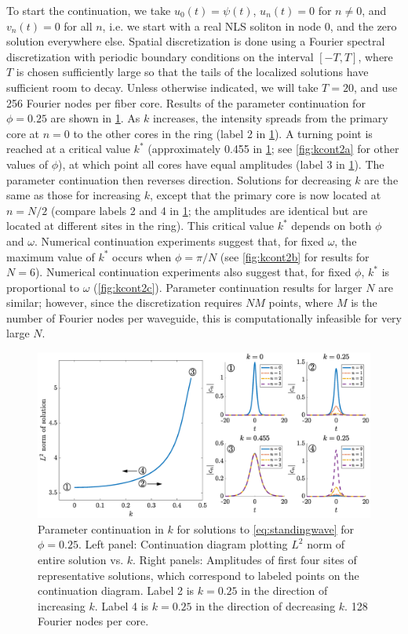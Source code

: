 \documentclass[11pt,reqno]{amsart}
\begin{document}
To start the continuation, we take $u_0(t) = \psi(t)$, $u_n(t) = 0$ for $n \neq 0$, and $v_n(t) = 0$ for all $n$, i.e. we start with a real NLS soliton in node 0, and the zero solution everywhere else. Spatial discretization is done using a Fourier spectral discretization with periodic boundary conditions on the interval $[-T,T]$, where $T$ is chosen sufficiently large so that the tails of the localized solutions have sufficient room to decay. Unless otherwise indicated, we will take $T=20$, and use 256 Fourier nodes per fiber core. Results of the parameter continuation for $\phi = 0.25$ are shown in \cref{fig:kcont}. As $k$ increases, the intensity spreads from the primary core at $n=0$ to the other cores in the ring (label 2 in \cref{fig:kcont}). A turning point is reached at a critical value $k^*$ (approximately 0.455 in \cref{fig:kcont}; see \cref{fig:kcont2a} for other values of $\phi$), at which point all cores have equal amplitudes (label 3 in \cref{fig:kcont}). The parameter continuation then reverses direction. Solutions for decreasing $k$ are the same as those for increasing $k$, except that the primary core is now located at $n=N/2$ (compare labels 2 and 4 in \cref{fig:kcont}; the amplitudes are identical but are located at different sites in the ring). This critical value $k^*$ depends on both $\phi$ and $\omega$. Numerical continuation experiments suggest that, for fixed $\omega$, the maximum value of $k^*$ occurs when $\phi = \pi/N$ (see \cref{fig:kcont2b} for results for $N=6$). Numerical continuation experiments also suggest that, for fixed $\phi$, $k^*$ is proportional to $\omega$ (\cref{fig:kcont2c}). Parameter continuation results for larger $N$ are similar; however, since the discretization requires $NM$ points, where $M$ is the number of Fourier nodes per waveguide, this is computationally infeasible for very large $N$.

\begin{figure}
    \centering
    \includegraphics[width=16cm]{contdiag.eps}
    \caption{Parameter continuation in $k$ for solutions to \cref{eq:standingwave} for $\phi=0.25$. Left panel: Continuation diagram plotting $L^2$ norm of entire solution vs. $k$. Right panels: Amplitudes of first four sites of representative solutions, which correspond to labeled points on the continuation diagram. Label 2 is $k=0.25$ in the direction of increasing $k$. Label 4 is $k=0.25$ in the direction of decreasing $k$. 128 Fourier nodes per core.}
    \label{fig:kcont}
\end{figure}
\end{document}
